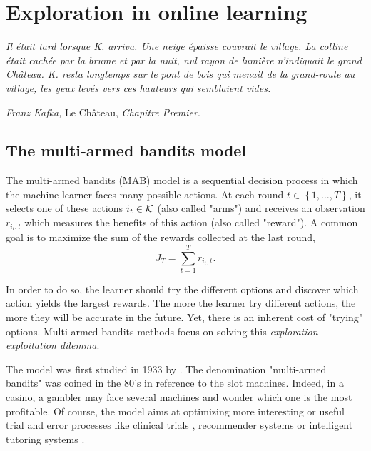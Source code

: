 \chapter{Exploration in online learning}
\vspace{-2.5cm}
{\emph{Il était tard lorsque K. arriva. Une neige épaisse couvrait le village. La colline était cachée par la brume et par la nuit, nul
rayon de lumière n’indiquait le grand Château. K. resta longtemps sur le pont de bois qui menait de la grand-route au village, les yeux levés vers ces hauteurs qui semblaient vides.} \\ \vspace{-1.2cm}
\begin{flushright}
\emph{Franz Kafka,} Le Château, \emph{Chapitre Premier}.
\end{flushright}

\label{ch:exploration}
\section{The multi-armed bandits model}

The multi-armed bandits (MAB) model is a sequential decision process in which the machine learner faces many possible actions. At each round $t \in \left\{ 1, \dots, T\right\}$, it selects one of these actions $i_t \in \mathcal{K}$ (also called "arms") and receives an observation  $r_{i_t, t}$ which measures the benefits of this action (also called "reward"). A common goal is to maximize the sum of the rewards collected at the last round,
\[
J_T = \sum_{t=1}^T r_{i_t,t}.
\]

In order to do so, the learner should try the different options and discover which action yields the largest rewards. The more the learner try different actions, the more they will be accurate in the future. Yet, there is an inherent cost of "trying" options. Multi-armed bandits methods focus on solving this \textit{exploration-exploitation dilemma}. 

The model was first studied in 1933 by \citet{thompson1933likelihood}. The denomination "multi-armed bandits" was coined in the 80's in reference to the slot machines. Indeed, in a casino, a gambler may face several machines and wonder which one is the most profitable. Of course, the model aims at optimizing more interesting or useful trial and error processes like clinical trials \citep{villar2015bandit}, recommender systems \citep{traca2015regulating} or intelligent tutoring systems \citep{clement2015multi, pikeburke2019phd}.

}
